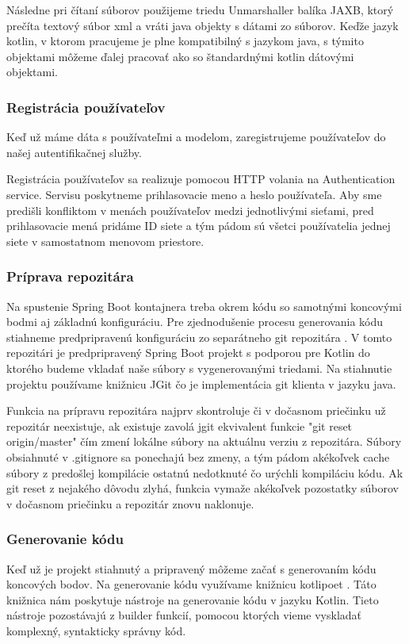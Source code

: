 Následne pri čítaní súborov použijeme triedu Unmarshaller balíka JAXB, ktorý prečíta textový súbor \acrshort{xml} a vráti java objekty s dátami zo súborov. Keďže jazyk kotlin, v ktorom pracujeme je plne kompatibilný s jazykom java, s týmito objektami môžeme ďalej pracovať ako so štandardnými kotlin dátovými objektami. 



\subsubsection{Registrácia používateľov} 
Keď už máme dáta s používateľmi a modelom, zaregistrujeme používateľov do našej autentifikačnej služby. 

Registrácia používateľov sa realizuje pomocou HTTP volania na Authentication service. Servisu poskytneme prihlasovacie meno a heslo používateľa. Aby sme predišli konfliktom v menách používateľov medzi jednotlivými sieťami, pred prihlasovacie mená pridáme ID siete a tým pádom sú všetci používatelia jednej siete v samostatnom menovom priestore. 


\subsubsection{Príprava repozitára} 
Na spustenie Spring Boot kontajnera treba okrem kódu so samotnými koncovými bodmi aj základnú konfiguráciu. Pre zjednodušenie procesu generovania kódu stiahneme predpripravenú konfiguráciu zo separátneho git repozitára \cite{dp_relay}. V tomto repozitári je predpripravený Spring Boot projekt s podporou pre Kotlin do ktorého budeme vkladať naše súbory s vygenerovanými triedami. Na stiahnutie projektu používame knižnicu JGit \cite{jgit} čo je implementácia git klienta v jazyku java. 


Funkcia na prípravu repozitára najprv skontroluje či v dočasnom priečinku už repozitár neexistuje, ak existuje zavolá jgit ekvivalent funkcie "git reset origin/master" čím zmení lokálne súbory na aktuálnu verziu z repozitára. Súbory obsiahnuté v .gitignore sa ponechajú bez zmeny, a tým pádom akékoľvek cache súbory z predošlej kompilácie ostatnú nedotknuté čo urýchli kompiláciu kódu. Ak git reset z nejakého dôvodu zlyhá, funkcia vymaže akékoľvek pozostatky súborov v dočasnom priečinku a repozitár znovu naklonuje. 


\subsubsection{Generovanie kódu} 
Keď už je projekt stiahnutý a pripravený môžeme začať s generovaním kódu koncových bodov. Na generovanie kódu  využívame knižnicu kotlipoet \cite{kotlipoet}. Táto knižnica nám poskytuje nástroje na generovanie kódu v jazyku Kotlin. Tieto nástroje pozostávajú z builder funkcií, pomocou ktorých vieme vyskladať komplexný, syntakticky správny kód. 

